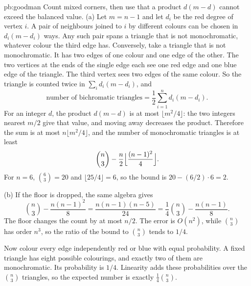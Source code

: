 \begin{solution}{pb:goodman}
\idea Count mixed corners, then use that a product $d(m-d)$ cannot exceed the balanced value.
\writeup (a) Let $m=n-1$ and let $d_i$ be the red degree of vertex $i$. A pair of neighbours joined to $i$ by different colours can be chosen in $d_i(m-d_i)$ ways. Any such pair spans a triangle that is not monochromatic, whatever colour the third edge has. Conversely, take a triangle that is not monochromatic. It has two edges of one colour and one edge of the other. The two vertices at the ends of the single edge each see one red edge and one blue edge of the triangle. The third vertex sees two edges of the same colour. So the triangle is counted twice in $\sum_i d_i(m-d_i)$, and
\[
 \text{number of bichromatic triangles}=\frac12\sum_{i=1}^n d_i(m-d_i).
\]
For an integer $d$, the product $d(m-d)$ is at most $\lfloor m^2/4\rfloor$: the two integers nearest $m/2$ give that value, and moving away decreases the product. Therefore the sum is at most $n\lfloor m^2/4\rfloor$, and the number of monochromatic triangles is at least
\[
 \binom n3-\frac n2\Bigl\lfloor\frac{(n-1)^2}4\Bigr\rfloor.
\]
For $n=6$, $\binom63=20$ and $\lfloor25/4\rfloor=6$, so the bound is $20-(6/2)\cdot6=2$.

(b) If the floor is dropped, the same algebra gives
\[
 \binom n3-\frac{n(n-1)^2}8=\frac{n(n-1)(n-5)}{24}=\frac14\binom n3-\frac{n(n-1)}8.
\]
The floor changes the count by at most $n/2$. The error is $O(n^2)$, while $\binom n3$ has order $n^3$, so the ratio of the bound to $\binom n3$ tends to $1/4$.

Now colour every edge independently red or blue with equal probability. A fixed triangle has eight possible colourings, and exactly two of them are monochromatic. Its probability is $1/4$. Linearity adds these probabilities over the $\binom n3$ triangles, so the expected number is exactly $\frac14\binom n3$.
\end{solution}

